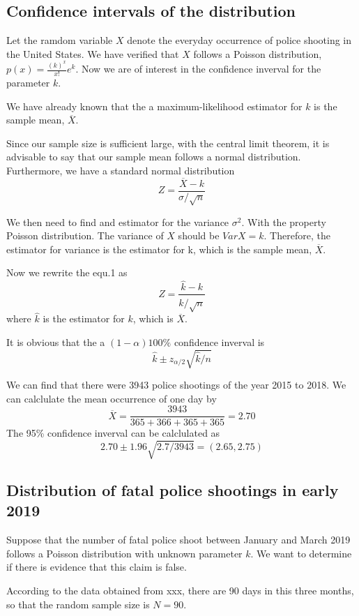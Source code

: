 \documentclass[conf]{new-aiaa}
\begin{document}
\subsection{Confidence intervals of the distribution}

Let the ramdom variable $X$ denote the everyday occurrence of police shooting in the United States. We have verified that $X$ follows a Poisson distribution, $p(x)=\frac{(k)^{x}}{x !} e^{k}$. Now we are of interest in the confidence inverval for the parameter $k$. 

We have already known that the a maximum-likelihood estimator for $k$ is the sample mean, $\overline{X}$. 

Since our sample size is sufficient large, with the central limit theorem, it is advisable to say that our sample mean follows a normal distribution. Furthermore, we have a standard normal distribution
\begin{equation}
    Z=\frac{\overline{X}-k}{\sigma / \sqrt{n}} 
\end{equation}


We then need to find and estimator for the variance $\sigma^2$. With the property Poisson distribution. The variance of $X$ should be $Var X = k$. Therefore, the estimator for variance is the estimator for k, which is the sample mean, $\overline{X}$.

Now we rewrite the equ.1 as 
$$
Z = \frac{\hat{k}-k}{ \hat{k}/ \sqrt{n}}
$$
where $\hat{k}$ is the estimator for $k$, which is $\overline{X}$.

It is obvious that the a $(1 - \alpha)100\%$ confidence inverval is 
$$
\hat{k} \pm z_{\alpha / 2} \sqrt{\hat{k} / n}
$$

We can find that there were 3943 police shootings of the year 2015 to 2018. We can calclulate the mean occurrence of one day by
$$
\overline{X} = \frac{3943}{365+366+365+365} = 2.70 
$$
The 95\% confidence inverval can be calclulated as 
$$
2.70 \pm 1.96 \sqrt{2.7/3943} = (2.65 , 2.75)
$$


\subsection{Distribution of fatal police shootings in early 2019}

Suppose that the number of fatal police shoot between January and March 2019 follows a Poisson distribution with unknown parameter $k$. We want
to determine if there is evidence that this claim is false.

According to the data obtained from xxx, there are 90 days in this three months, so that the random sample size is $N=90$.
\end{document}
